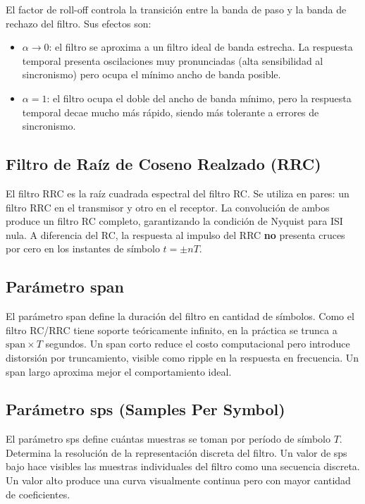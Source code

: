 \documentclass[12pt, a4paper]{article}
\begin{document}
El factor de roll-off controla la transición entre la banda de paso y la banda
de rechazo del filtro. Sus efectos son:

\begin{itemize}
    \item $\alpha \to 0$: el filtro se aproxima a un filtro ideal de banda estrecha.
    La respuesta temporal presenta oscilaciones muy pronunciadas (alta sensibilidad
    al sincronismo) pero ocupa el mínimo ancho de banda posible.
    \item $\alpha = 1$: el filtro ocupa el doble del ancho de banda mínimo, pero
    la respuesta temporal decae mucho más rápido, siendo más tolerante a errores
    de sincronismo.
\end{itemize}

\subsection{Filtro de Raíz de Coseno Realzado (RRC)}

El filtro RRC es la raíz cuadrada espectral del filtro RC. Se utiliza en pares:
un filtro RRC en el transmisor y otro en el receptor. La convolución de ambos
produce un filtro RC completo, garantizando la condición de Nyquist para ISI nula.
A diferencia del RC, la respuesta al impulso del RRC \textbf{no} presenta cruces
por cero en los instantes de símbolo $t = \pm nT$.

\subsection{Parámetro span}

El parámetro span define la duración del filtro en cantidad de símbolos. Como el
filtro RC/RRC tiene soporte teóricamente infinito, en la práctica se trunca a
$\text{span} \times T$ segundos. Un span corto reduce el costo computacional pero
introduce distorsión por truncamiento, visible como ripple en la respuesta en
frecuencia. Un span largo aproxima mejor el comportamiento ideal.

\subsection{Parámetro sps (Samples Per Symbol)}

El parámetro sps define cuántas muestras se toman por período de símbolo $T$.
Determina la resolución de la representación discreta del filtro. Un valor de
sps bajo hace visibles las muestras individuales del filtro como una secuencia
discreta. Un valor alto produce una curva visualmente continua pero con mayor
cantidad de coeficientes.
\end{document}
